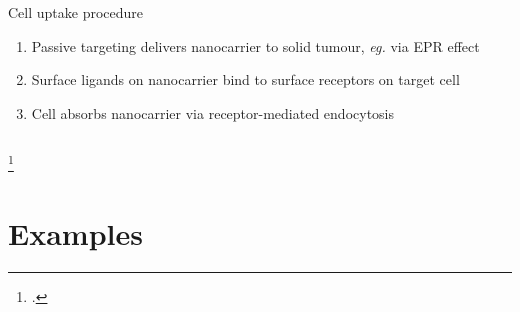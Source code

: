 \documentclass[aspectratio=169,compress]{beamer}
\newcommand*{\autotitle}{\subsecname\hfill\textbf{\small\secname}}
\begin{document}
\begin{frame}[fragile]{\autotitle}
\begin{columns}
      \begin{block}{Cell uptake procedure}
        \begin{enumerate}
            \item Passive targeting delivers nanocarrier to solid tumour, \emph{eg.} via EPR effect~
            \item Surface \alert{ligands} on nanocarrier bind to surface \alert{receptors} on target cell
            \item Cell absorbs nanocarrier via \alert{receptor-mediated endocytosis}~
        \end{enumerate}
      \end{block}

  \end{columns}
  \footcitetext{maeda2000tumor,sun2014engineered}
\end{frame}


\section{Examples}
\end{document}
